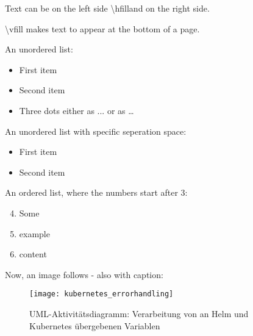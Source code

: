 Text can be on the left side \hfill \textbackslash hfilland on the right side.

\vfill \textbackslash vfill makes text to appear at the bottom of a page.

An unordered list:
\begin{itemize}
  \item First item
  \item Second item
  \item Three dots either as ... or as \ldots
\end{itemize}

An unordered list with specific seperation space:
\begin{itemize}
  \setlength{\itemsep}{0pt}
  \item First item
  \item Second item
\end{itemize}

An ordered list, where the numbers start after 3:
\begin{enumerate}
  \setcounter{enumi}{3}
  \item Some
  \item example
  \item content
\end{enumerate}


Now, an image follows - also with caption:

\begin{figure}[H]
\texttt{[image: kubernetes\_errorhandling]}
\centering
\caption{UML-Aktivitätsdiagramm: Verarbeitung von an Helm und Kubernetes übergebenen Variablen}
\label{image:kubernetes_errorhandling}
\end{figure}
